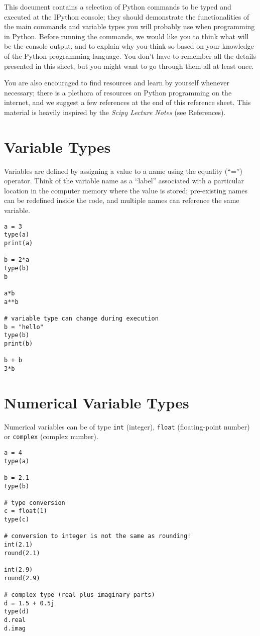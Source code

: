 
This document contains a selection of Python commands to be typed and executed at the IPython console; they should demonstrate the functionalities of the main commands and variable types you will probably use when programming in Python. Before running the commands, we would like you to think what will be the console output, and to explain why you think so based on your knowledge of the Python programming language. You don't have to remember all the details presented in this sheet, but you might want to go through them all at least once.

You are also encouraged to find resources and learn by yourself whenever necessary; there is a plethora of resources on Python programming on the internet, and we suggest a few references at the end of this reference sheet. This material is heavily inspired by the \emph{Scipy Lecture Notes} (see References).

\newpage

\section{Variable Types}

Variables are defined by assigning a value to a name using the equality (``='') operator. Think of the variable name as a ``label'' associated with a particular location in the computer memory where the value is stored; pre-existing names can be redefined inside the code, and multiple names can reference the same variable.

\begin{lstlisting}[frame=single]
a = 3
type(a)
print(a)

b = 2*a
type(b)
b

a*b
a**b

# variable type can change during execution
b = "hello"
type(b)    
print(b)

b + b
3*b
\end{lstlisting}

\section{Numerical Variable Types}

Numerical variables can be of type {\tt int} (integer), {\tt float} (floating-point number) or {\tt complex} (complex number).

\begin{lstlisting}[frame=single]
a = 4
type(a) 

b = 2.1
type(b)

# type conversion
c = float(1)
type(c)

# conversion to integer is not the same as rounding!
int(2.1)
round(2.1)

int(2.9)
round(2.9)

# complex type (real plus imaginary parts)
d = 1.5 + 0.5j
type(d)
d.real
d.imag

\end{lstlisting}

